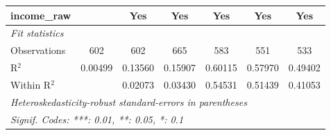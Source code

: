 \begin{tabular}{lcccccc}
   income\_raw            &               & Yes           & Yes          & Yes           & Yes          & Yes\\  
   \midrule
   \emph{Fit statistics}\\
   Observations           & 602           & 602           & 665          & 583           & 551          & 533\\  
   R$^2$                  & 0.00499       & 0.13560       & 0.15907      & 0.60115       & 0.57970      & 0.49402\\  
   Within R$^2$           &               & 0.02073       & 0.03430      & 0.54531       & 0.51439      & 0.41053\\  
   \midrule \midrule
   \multicolumn{7}{l}{\emph{Heteroskedasticity-robust standard-errors in parentheses}}\\
   \multicolumn{7}{l}{\emph{Signif. Codes: ***: 0.01, **: 0.05, *: 0.1}}\\
\end{tabular}
\par\endgroup


